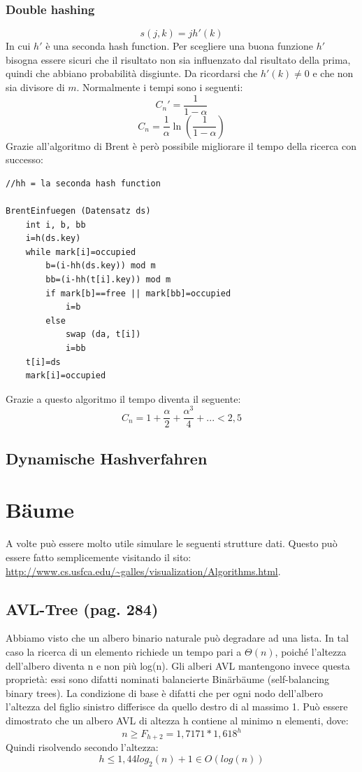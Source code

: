 \documentclass[a4paper]{book}
\begin{document}
\subsection{Double hashing}
$$s(j,k)=jh'(k) $$
In cui $h'$ è una seconda hash function. Per scegliere una buona funzione $h'$ bisogna essere sicuri che il risultato non sia influenzato dal risultato della prima, quindi che abbiano probabilità disgiunte. Da ricordarsi che $h'(k) \neq 0$ e che non sia divisore di $m$. Normalmente i tempi sono i seguenti:
$$ C_n '= \frac{1}{1-\alpha} $$
$$ C_n = \frac{1}{\alpha} \ln \left(\frac{1}{1-\alpha}\right)$$
Grazie all'algoritmo di Brent è però possibile migliorare il tempo della ricerca con successo:
\begin{lstlisting}
//hh = la seconda hash function

BrentEinfuegen (Datensatz ds)
	int i, b, bb
	i=h(ds.key)
	while mark[i]=occupied
		b=(i-hh(ds.key)) mod m
		bb=(i-hh(t[i].key)) mod m
		if mark[b]==free || mark[bb]=occupied
			i=b
		else
			swap (da, t[i])
			i=bb
	t[i]=ds
	mark[i]=occupied			
\end{lstlisting}
Grazie a questo algoritmo il tempo diventa il seguente:
$$C_n = 1+\frac{\alpha}{2}+\frac{\alpha ^3}{4}+... <2,5$$
\section{Dynamische Hashverfahren}
\chapter{Bäume}
A volte può essere molto utile simulare le seguenti strutture dati. Questo può essere fatto semplicemente visitando il sito: \url{http://www.cs.usfca.edu/~galles/visualization/Algorithms.html}.
\section{AVL-Tree (pag. 284)}
Abbiamo visto che un albero binario naturale può degradare ad una lista. In tal caso la ricerca di un elemento richiede un tempo pari a $\Theta (n)$, poiché l'altezza dell'albero diventa n e non più log(n). Gli alberi AVL mantengono invece questa proprietà: essi sono difatti nominati balancierte Binärbäume (self-balancing binary trees). La condizione di base è difatti che per ogni nodo dell'albero l'altezza del figlio sinistro differisce da quello destro di al massimo 1. Può essere dimostrato che un albero AVL di altezza h contiene al minimo n elementi, dove:
$$ n\geq F_{h+2} = 1,7171*1,618^h$$
Quindi risolvendo secondo l'altezza:
$$ h\leq 1,44 log_2 (n)+1 \in O(log(n))$$
\end{document}
